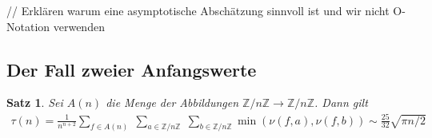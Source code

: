 \documentclass[a4paper, 10pt, ngerman]{article}
\newcommand{\Z}{\mathbb{Z}}
\newtheorem{theorem}{Satz}
\begin{document}
// Erklären warum eine asymptotische Abschätzung sinnvoll ist und wir nicht O-Notation verwenden

\subsection{Der Fall zweier Anfangswerte}

\begin{theorem}
    Sei $A(n)$ die Menge der Abbildungen $\Z/n\Z \to \Z/n\Z$. Dann gilt
    \begin{align*}
        \tau(n) = \frac 1 {n^{n + 2}} \sum_{f \in A(n)} \; \sum_{a \in \Z/n\Z} \; \sum_{b \in \Z/n\Z} \min(\nu(f, a), \nu(f, b)) \sim \frac {25} {32} \sqrt{\pi n / 2}
    \end{align*}
\end{theorem}
\end{document}
